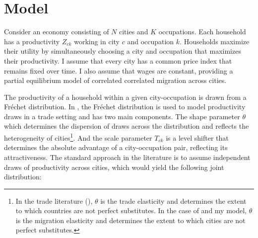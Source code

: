 \documentclass[10pt]{article}
\begin{document}
\section{Model}



Consider an economy consisting of $N$ cities and $K$ occupations. Each household has a productivity $Z_{ck}$ working in city $c$ and occupation $k$. Households maximize their utility by simultaneously choosing a city and occupation that maximizes their productivity. I assume that every city has a common price index that remains fixed over time. I also assume that wages are constant, providing a partial equilibrium model of correlated correlated migration across cities.

The productivity of a household within a given city-occupation is drawn from a Fr\'{e}chet distribution. In \cite{redding}, the Fr\'{e}chet distribution is used to model productivity draws in a trade setting and has two main components. The shape parameter $\theta$ which determines the dispersion of draws across the distribution and reflects the heterogeneity of cities\footnote{In the trade literature (\cite{ek}), $\theta$ is the trade elasticity and determines the extent to which countries are not perfect substitutes. In the case of \cite{redding} and my model, $\theta$ is the migration elasticity and determines the extent to which cities are not perfect substitutes.}. And the scale parameter $T_{ck}$ is a level shifter that determines the absolute advantage of a city-occupation pair, reflecting its attractiveness. The standard approach in the literature is to assume independent draws of productivity across cities, which would yield the following joint distribution:
\end{document}
